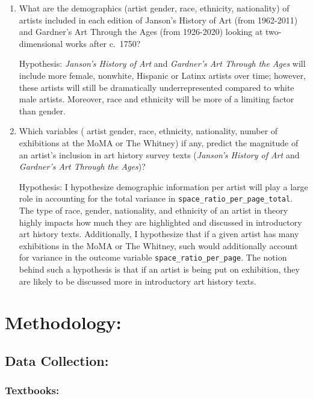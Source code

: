 \documentclass[
  letterpaper,
  DIV=11,
  numbers=noendperiod]{scrreprt}
\begin{document}
\begin{enumerate}
\def\labelenumi{\arabic{enumi}.}
\item
  What are the demographics (artist gender, race, ethnicity,
  nationality) of artists included in each edition of Janson's History
  of Art (from 1962-2011) and Gardner's Art Through the Ages (from
  1926-2020) looking at two-dimensional works after c.~1750?

  Hypothesis: \emph{Janson's History of Art} and \emph{Gardner's Art
  Through the Ages} will include more female, nonwhite, Hispanic or
  Latinx artists over time; however, these artists will still be
  dramatically underrepresented compared to white male artists.
  Moreover, race and ethnicity will be more of a limiting factor than
  gender.
\item
  Which variables ( artist gender, race, ethnicity, nationality, number
  of exhibitions at the MoMA or The Whitney) if any, predict the
  magnitude of an artist's inclusion in art history survey texts
  (\emph{Janson's History of Art} and \emph{Gardner's Art Through the
  Ages})?

  Hypothesis: I hypothesize demographic information per artist will play
  a large role in accounting for the total variance in
  \texttt{space\_ratio\_per\_page\_total}. The type of race, gender,
  nationality, and ethnicity of an artist in theory highly impacts how
  much they are highlighted and discussed in introductory art history
  texts. Additionally, I hypothesize that if a given artist has many
  exhibitions in the MoMA or The Whitney, such would additionally
  account for variance in the outcome variable
  \texttt{space\_ratio\_per\_page}. The notion behind such a hypothesis
  is that if an artist is being put on exhibition, they are likely to be
  discussed more in introductory art history texts.
\end{enumerate}

\hypertarget{methodology}{%
\chapter{\texorpdfstring{\textbf{Methodology:}}{Methodology:}}\label{methodology}}

\hypertarget{data-collection}{%
\section{Data Collection:}\label{data-collection}}

\hypertarget{textbooks}{%
\subsection{Textbooks:}\label{textbooks}}
\end{document}
